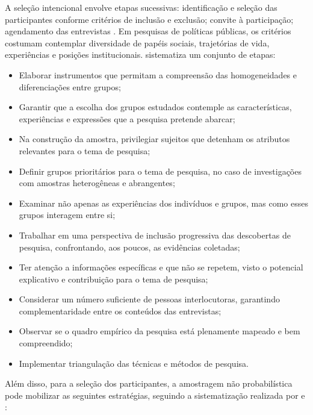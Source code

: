\documentclass[12pt, a4paper, openany]{book}
\begin{document}
A sele\c{c}\~ao intencional envolve etapas sucessivas: identifica\c{c}\~ao e sele\c{c}\~ao das participantes conforme crit\'erios de inclus\~ao e exclus\~ao; convite \`a participa\c{c}\~ao; agendamento das entrevistas \citep{leitao2024entrevista,depaula2014modos}. Em pesquisas de pol\'iticas p\'ublicas, os crit\'erios costumam contemplar diversidade de pap\'eis sociais, trajet\'orias de vida, experi\^encias e posi\c{c}\~oes institucionais. \citet{minayo2017amostragem} sistematiza um conjunto de etapas:

\begin{itemize}
\item Elaborar instrumentos que permitam a compreens\~ao das homogeneidades e diferencia\c{c}\~oes entre grupos;
\item Garantir que a escolha dos grupos estudados contemple as caracter\'isticas, experi\^encias e express\~oes que a pesquisa pretende abarcar;
\item Na constru\c{c}\~ao da amostra, privilegiar sujeitos que detenham os atributos relevantes para o tema de pesquisa;
\item Definir grupos priorit\'arios para o tema de pesquisa, no caso de investiga\c{c}\~oes com amostras heterog\^eneas e abrangentes;
\item Examinar n\~ao apenas as experi\^encias dos indiv\'iduos e grupos, mas como esses grupos interagem entre si;
\item Trabalhar em uma perspectiva de inclus\~ao progressiva das descobertas de pesquisa, confrontando, aos poucos, as evid\^encias coletadas;
\item Ter aten\c{c}\~ao a informa\c{c}\~oes espec\'ificas e que n\~ao se repetem, visto o potencial explicativo e contribui\c{c}\~ao para o tema de pesquisa;
\item Considerar um n\'umero suficiente de pessoas interlocutoras, garantindo complementaridade entre os conte\'udos das entrevistas;
\item Observar se o quadro emp\'irico da pesquisa est\'a plenamente mapeado e bem compreendido;
\item Implementar triangula\c{c}\~ao das t\'ecnicas e m\'etodos de pesquisa.
\end{itemize}

Al\'em disso, para a sele\c{c}\~ao dos participantes, a amostragem n\~ao probabil\'istica pode mobilizar as seguintes estrat\'egias, seguindo a sistematiza\c{c}\~ao realizada por \citet{rocha2020teoria} e \citet{campos2022amostragem}:
\end{document}

